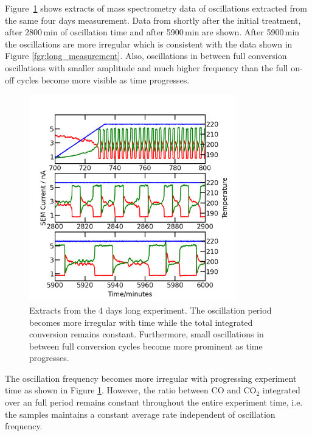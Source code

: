\documentclass[8.5pt,twoside,twocolumn]{article}
\begin{document}
Figure~\ref{fgr:extracts} shows extracts of mass spectrometry data of oscillations extracted from the same four days measurement. Data from shortly after the initial treatment, after 2800\,min of oscillation time and after 5900\,min are shown. After 5900\,min the oscillations are more irregular which is consistent with the data shown in Figure \ref{fgr:long_measurement}. Also, oscillations in between full conversion oscillations with smaller amplitude and much higher frequency than the full on-off cycles become more visible as time progresses.
\begin{figure}[h]
  \centering
  \includegraphics[width=9cm]{extracts_from_very_long_oscillation.png}
  \caption{Extracts from the 4 days long experiment. The oscillation period becomes more irregular with time while the total integrated conversion remains constant. Furthermore, small oscillations in between full conversion cycles become more prominent as time progresses.}
  \label{fgr:extracts}
\end{figure}

The oscillation frequency becomes more irregular with progressing experiment time as shown in Figure \ref{fgr:extracts}. However, the ratio between CO and CO$_2$ integrated over an full period remains constant throughout the entire experiment time, i.e. the samples maintains a constant average rate independent of oscillation frequency. 

\end{document}
